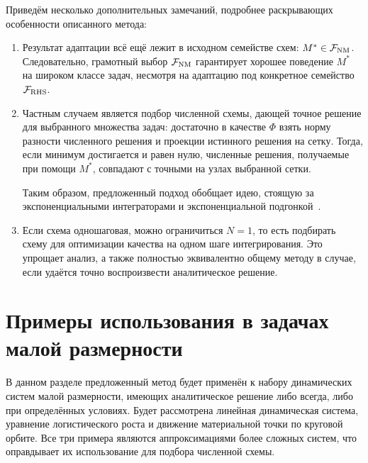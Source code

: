Приведём несколько дополнительных замечаний, подробнее раскрывающих особенности описанного метода:
\begin{enumerate}
    \item
        Результат адаптации всё ещё лежит в исходном семействе схем: $ M^* \in \mathcal{F}_{\textnormal{NM}} $.
        Следовательно, грамотный выбор $ \mathcal{F}_{\textnormal{NM}} $ гарантирует хорошее поведение $ M^* $
        на широком классе задач, несмотря на адаптацию под конкретное семейство $ \mathcal{F}_{\textnormal{RHS}} $.

    \item
        Частным случаем является подбор численной схемы,
        дающей точное решение для выбранного множества задач:
        достаточно в качестве $ \Phi $ взять норму разности численного решения и проекции истинного решения на сетку.
        Тогда, если минимум достигается и равен нулю,
        численные решения, получаемые при помощи $ M^* $, совпадают с точными на узлах выбранной сетки.

        Таким образом, предложенный подход обобщает идею, стоящую за экспоненциальными интеграторами
        и экспоненциальной подгонкой~\cite{liniger1970efficient_integration_methods, lambert1991methods, hollevoet2013exponential_fitting}.

    \item
        Если схема одношаговая, можно ограничиться $ N = 1 $,
        то есть подбирать схему для оптимизации качества на одном шаге интегрирования.
        Это упрощает анализ, а также полностью эквивалентно общему методу в случае,
        если удаётся точно воспроизвести аналитическое решение.
\end{enumerate}


\section{Примеры использования в задачах малой размерности}
\label{section:methods:low_dimensional_examples}

В данном разделе предложенный метод будет применён к набору динамических систем малой размерности,
имеющих аналитическое решение либо всегда, либо при определённых условиях.
Будет рассмотрена линейная динамическая система,
уравнение логистического роста и движение материальной точки по круговой орбите.
Все три примера являются аппроксимациями более сложных систем,
что оправдывает их использование для подбора численной схемы.

